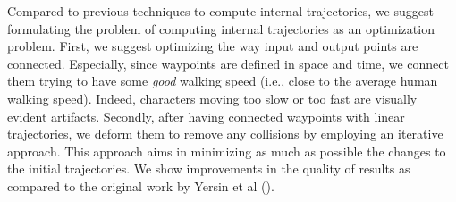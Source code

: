 Compared to previous techniques to compute internal trajectories, we suggest formulating the problem of computing internal trajectories as an optimization problem.
First, we suggest optimizing the way input and output points are connected.
Especially, since waypoints are defined in space and time, we connect them trying to have some {\it good} walking speed (i.e., close to the average human walking speed).
Indeed, characters moving too slow or too fast are visually evident artifacts.
Secondly, after having connected waypoints with linear trajectories, we deform them to remove any collisions by employing an iterative approach.
This approach aims in minimizing as much as possible the changes to the initial trajectories.
We show improvements in the quality of results as compared to the original work by Yersin et al ().


